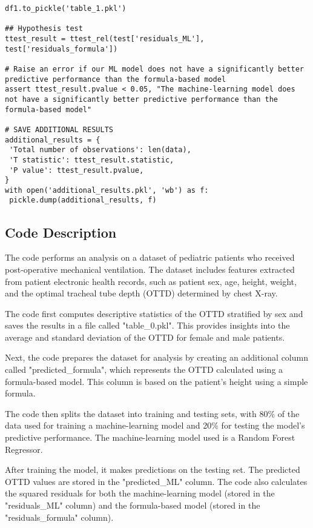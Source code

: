 \documentclass[11pt]{article}
\begin{document}
\begin{verbatim}
df1.to_pickle('table_1.pkl')

## Hypothesis test
ttest_result = ttest_rel(test['residuals_ML'], test['residuals_formula'])

# Raise an error if our ML model does not have a significantly better predictive performance than the formula-based model
assert ttest_result.pvalue < 0.05, "The machine-learning model does not have a significantly better predictive performance than the formula-based model"

# SAVE ADDITIONAL RESULTS
additional_results = {
 'Total number of observations': len(data), 
 'T statistic': ttest_result.statistic, 
 'P value': ttest_result.pvalue,
}
with open('additional_results.pkl', 'wb') as f:
 pickle.dump(additional_results, f)

\end{verbatim}

\subsection{Code Description}

The code performs an analysis on a dataset of pediatric patients who received post-operative mechanical ventilation. The dataset includes features extracted from patient electronic health records, such as patient sex, age, height, weight, and the optimal tracheal tube depth (OTTD) determined by chest X-ray.

The code first computes descriptive statistics of the OTTD stratified by sex and saves the results in a file called "table\_0.pkl". This provides insights into the average and standard deviation of the OTTD for female and male patients.

Next, the code prepares the dataset for analysis by creating an additional column called "predicted\_formula", which represents the OTTD calculated using a formula-based model. This column is based on the patient's height using a simple formula. 

The code then splits the dataset into training and testing sets, with 80\% of the data used for training a machine-learning model and 20\% for testing the model's predictive performance. The machine-learning model used is a Random Forest Regressor.

After training the model, it makes predictions on the testing set. The predicted OTTD values are stored in the "predicted\_ML" column. The code also calculates the squared residuals for both the machine-learning model (stored in the "residuals\_ML" column) and the formula-based model (stored in the "residuals\_formula" column).
\end{document}
